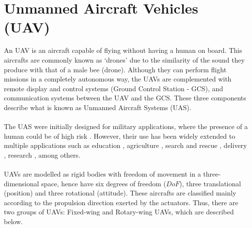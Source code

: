 \section{Unmanned Aircraft Vehicles (UAV)}
An UAV is an aircraft capable of flying without having a human on board. This aircrafts are commonly known as `drones' due to the similarity of the sound they produce with that of a male bee (drone). Although they can perform flight missions in a completely autonomous way, the UAVs are complemented with remote display and control systems (Ground Control Station - GCS), and communication systems between the UAV and the GCS. These three components describe what is known as Unmanned Aircraft Systems (UAS).\\\\
The UAS were initially designed for military applications, where the presence of a human could be of high risk \cite{Bouabdallah2007}. However, their use has been widely extended to multiple applications such as education \cite{Rahman2017}, agriculture \cite{Garcia2015}, search and rescue \cite{KumarS2015}, delivery \cite{Gatteschi2015}, research \cite{Gonzalez2012}, among others. 
\\\\
UAVs are modelled as rigid bodies with freedom of movement in a three-dimensional space, hence have six degrees of freedom ($DoF$), three translational (position) and three rotational (attitude). These aircrafts are classified mainly according to the propulsion direction exerted by the actuators. Thus, there are two groups of UAVs: Fixed-wing and Rotary-wing UAVs, which are described below.

